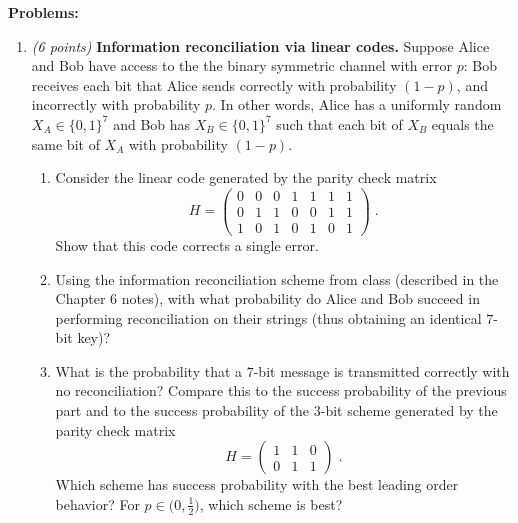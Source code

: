 \documentclass[12pt]{article}
\begin{document}
{\bf Problems:}
\begin{enumerate}



\item \emph{(6 points)} {\bf Information reconciliation via linear codes.}
Suppose Alice and Bob have access to the the binary symmetric channel with
error $p$: Bob receives each bit that Alice sends correctly with probability $(1-p)$, and incorrectly with probability $p$. In other words, Alice has a uniformly random $X_A \in \{0,1\}^7$ and Bob has $X_B \in \{0,1\}^7$ such that each bit of $X_B$ equals the same bit of $X_A$ with probability $(1-p)$. 
\begin{enumerate}
\item 
Consider the linear code generated by the parity check matrix
\[H = \begin{pmatrix} 0 & 0 & 0 & 1 & 1 & 1 & 1 \\
0 & 1 & 1 & 0 & 0 & 1 & 1 \\
1 & 0 & 1 & 0 & 1 & 0 & 1
\end{pmatrix}\;.\]
Show that this code corrects a single error. 
\item
Using the information reconciliation scheme from class (described in the Chapter 6 notes), with what probability do Alice and Bob succeed in performing reconciliation on their strings (thus obtaining an identical $7$-bit key)?
\item What is the probability that a $7$-bit message is transmitted correctly with no
reconciliation? Compare this to the success probability of the previous part and
to the success probability of the $3$-bit scheme generated by the parity check matrix
\[H = \begin{pmatrix} 1 & 1 & 0 \\ 0 & 1 & 1\end{pmatrix}\;.\]
Which scheme has success probability with the best leading order
behavior? For $p\in \big(0,\frac{1}{2}\big)$, which scheme is best?
\end{enumerate}


\end{enumerate}
\end{document}
